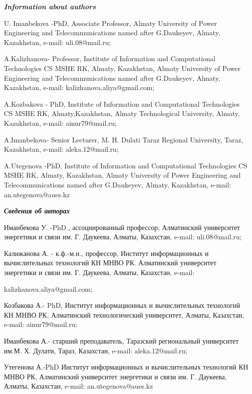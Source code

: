 \emph{{\bfseries Information about authors}}

\begin{noparindent}
U. Imanbekova -PhD, Associate Professor, Almaty University of Power
Engineering and Telecommunications named after G.Daukeyev, Almaty,
Kazakhstan, e-mail: uli.08@mail.ru;

A.Kalizhanova- Professor, Institute of Information and Computational
Technologies CS MSHE RK, Almaty, Kazakhstan, Almaty University of Power
Engineering and Telecommunications named after G.Daukeyev, Almaty,
Kazakhstan, e-mail: kalizhanova.aliya@gmail.com;

A.Kozbakova - PhD, Institute of Information and Computational
Technologies CS MSHE RK, Almaty,Kazakhstan, Almaty Technological
University, Almaty, Kazakhstan, e-mail: ainur79@mail.ru;

A.Imanbekova- Senior Lecturer, M. H. Dulati Taraz Regional University,
Taraz, Kazakhstan, e-mail: aleka.12@mail.ru;

A.Utegenova -PhD, Institute of Information and Computational
Technologies CS MSHE RK, Almaty, Kazakhstan, Almaty University of Power
Engineering and Telecommunications named after G.Daukeyev, Almaty,
Kazakhstan, e-mail: an.utegenova@aues.kz
\end{noparindent}

\emph{{\bfseries Сведения об авторах}}

\begin{noparindent}
Иманбекова У. -PhD., ассоциированный профессор, Алматинский университет
энергетики и связи им. Г. Даукеева, Алматы, Казахстан, e-mail:
uli.08@mail.ru;

Калижанова А. - к.ф.-м.н., профессор, Институт информационных и
вычислительных технологий КН МНВО РК. Алматинский университет энергетики
и связи им. Г. Даукеева, Алматы, Казахстан, e-mail:

kalizhanova.aliya@gmail.com;

Козбакова А.- PhD, Институт информационных и вычислительных технологий
КН МНВО РК, Алматинский технологический университет, Алматы, Казахстан,
e-mail: ainur79@mail.ru;

Иманбекова А.- старший преподаватель, Таразский региональный университет
им.М. Х. Дулати, Тараз, Казахстан, e-mail: aleka.12@mail.ru;

Утегенова А.-PhD Институт информационных и вычислительных технологий КН
МНВО РК, Алматинский университет энергетики и связи им. Г. Даукеева,
Алматы, Казахстан, e-mail: an.utegenova@aues.kz
\end{noparindent}
